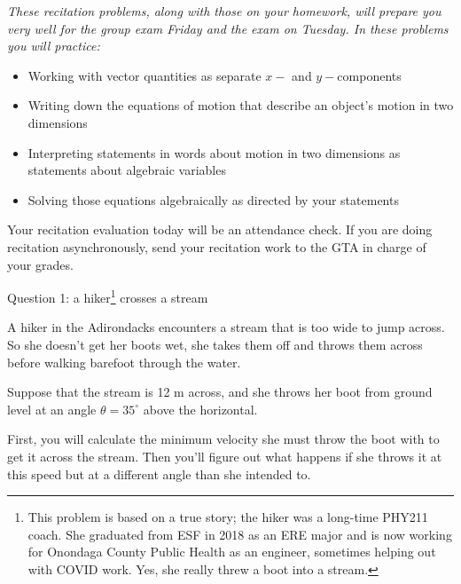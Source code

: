 \documentclass[12pt]{article}
\newcommand{\BI}{\begin{itemize}}
\newcommand{\EI}{\end{itemize}}
\begin{document}
\Large
\centerline{}
\normalsize
\centerline{}

\it These recitation problems, along with those on your homework, will prepare you very well for the group exam Friday and the exam on Tuesday. In these problems you will practice:

\rm

\BI
\item Working with vector quantities as separate $x-$ and $y-$components
\item Writing down the equations of motion that describe an object's motion in two dimensions
\item Interpreting statements in words about motion in two dimensions as statements about algebraic variables
\item Solving those equations algebraically as directed by your statements
\EI


Your recitation evaluation today will be an attendance check. If you are doing recitation asynchronously, send your recitation work to the GTA in charge of your grades.

\newpage

\rm 


\centerline{\Large Question 1: a hiker\footnote{\noindent This problem is based on a true story; the hiker was a long-time PHY211 coach. She graduated from ESF in 2018 as an ERE major and is now working for Onondaga County Public Health as an engineer, sometimes helping out with COVID work. Yes, she really threw a boot into a stream.} crosses a stream}     
A hiker in the Adirondacks encounters a stream that is too wide to jump across. So she doesn't get her boots wet, she takes them off and throws them across before walking barefoot through the water. 

Suppose that the stream is 12 m across, and she throws her boot from
ground level at an angle $\theta = 35^\circ$ above the horizontal.

First, you will calculate the minimum velocity she must throw the boot with to get it across the stream. Then you'll figure out what happens if she throws it at this speed but at a different angle than she intended to.
\end{document}
